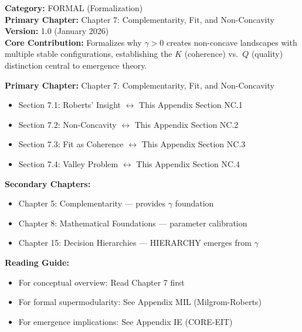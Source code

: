 
\begin{tcolorbox}[colback=blue!5!white, colframe=blue!75!black,
    title=\textbf{Appendix: NC (FORMAL-NC)}]
\textbf{Category:} FORMAL (Formalization) \\
\textbf{Primary Chapter:} Chapter 7: Complementarity, Fit, and Non-Concavity \\
\textbf{Version:} 1.0 (January 2026) \\
\textbf{Core Contribution:} Formalizes why $\gamma > 0$ creates non-concave landscapes with multiple stable configurations, establishing the $K$ (coherence) vs.\ $Q$ (quality) distinction central to emergence theory.
\end{tcolorbox}


\begin{tcolorbox}[colback=purple!5!white, colframe=purple!75!black,
    title=Chapter Linkage]

\textbf{Primary Chapter:} Chapter 7: Complementarity, Fit, and Non-Concavity
\begin{itemize}[nosep]
\item Section 7.1: Roberts' Insight $\leftrightarrow$ This Appendix Section NC.1
\item Section 7.2: Non-Concavity $\leftrightarrow$ This Appendix Section NC.2
\item Section 7.3: Fit as Coherence $\leftrightarrow$ This Appendix Section NC.3
\item Section 7.4: Valley Problem $\leftrightarrow$ This Appendix Section NC.4
\end{itemize}

\textbf{Secondary Chapters:}
\begin{itemize}[nosep]
\item Chapter 5: Complementarity --- provides $\gamma$ foundation
\item Chapter 8: Mathematical Foundations --- parameter calibration
\item Chapter 15: Decision Hierarchies --- HIERARCHY emerges from $\gamma$
\end{itemize}

\textbf{Reading Guide:}
\begin{itemize}[nosep]
\item For conceptual overview: Read Chapter 7 first
\item For formal supermodularity: See Appendix MIL (Milgrom-Roberts)
\item For emergence implications: See Appendix IE (CORE-EIT)
\end{itemize}

\end{tcolorbox}

